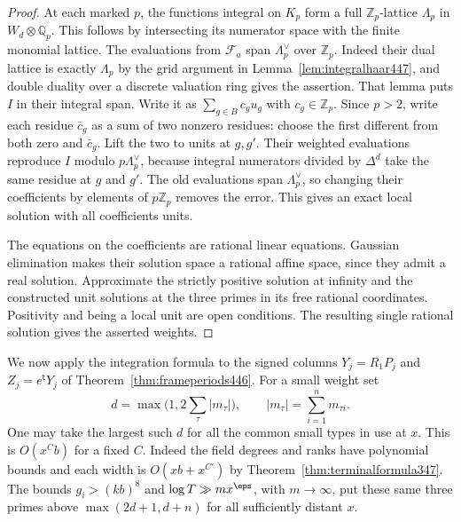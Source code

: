 \documentclass[a4paper,11pt]{article}
\theoremstyle{definition}
\theoremstyle{remark}
\numberwithin{equation}{section}
\begin{document}
\begin{proof}
At each marked \(p\), the functions integral on \(K_p\) form a
full \(\mathbb Z_p\)-lattice \(\Lambda_p\) in \(W_d\otimes\mathbb Q_p\).
This follows by intersecting its numerator space with the finite
monomial lattice. The evaluations from \(\mathcal F_a\) span
\(\Lambda_p^\vee\) over \(\mathbb Z_p\). Indeed their dual lattice
is exactly \(\Lambda_p\) by the grid argument in
Lemma~\ref{lem:integralhaar447}, and double duality over a
discrete valuation ring gives the assertion. That lemma puts
\(I\) in their integral span. Write it as \(\sum_{g\in B}c_g u_g\)
with \(c_g\in\mathbb Z_p\). Since \(p>2\), write each residue
\(\bar c_g\) as a sum of two nonzero residues: choose the first
different from both zero and \(\bar c_g\). Lift the two to units
at \(g,g'\). Their weighted evaluations reproduce \(I\) modulo
\(p\Lambda_p^\vee\), because integral numerators divided by
\(\Delta^d\) take the same residue at \(g\) and \(g'\).
The old evaluations span \(\Lambda_p^\vee\), so changing their
coefficients by elements of \(p\mathbb Z_p\) removes the error.
This gives an exact local solution with all coefficients units.

The equations on the coefficients are rational linear equations.
Gaussian elimination makes their solution space a rational affine
space, since they admit a real solution. Approximate the strictly
positive solution at infinity and the constructed unit solutions
at the three primes in its free rational coordinates. Positivity
and being a local unit are open conditions. The resulting single
rational solution gives the asserted weights.
\end{proof}

We now apply the integration formula to the signed columns
\(Y_j=R_1P_j\) and \(Z_j=e^{\mathsf t}Y_j\) of
Theorem~\ref{thm:frameperiods446}. For a small weight set
\[
                  d=\max\bigl(1,2\sum_\tau |m_\tau|\bigr),
           \qquad |m_\tau|=\sum_{i=1}^n m_{\tau i}.
\]
One may take the largest such \(d\) for all the common small types
in use at \(x\). This is \(O(x^C b)\) for a fixed \(C\).
Indeed the field degrees and ranks have polynomial bounds and
each width is \(O(xb+x^{C'})\) by Theorem~\ref{thm:terminalformula347}.
The bounds \(g_i>(kb)^8\) and \(\log T\gg m x^\eps\), with
\(m\longrightarrow\infty\), put these same three primes above
\(\max(2d+1,d+n)\) for all sufficiently distant \(x\).
\end{document}
